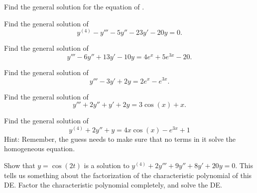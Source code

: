 \begin{exercise}
Find the general solution for the equation of .
\end{exercise}

\begin{exercise}\ansMark%
Find the general solution of
\begin{equation*}
y^{(4)} - y''' - 5y'' - 23y' - 20y = 0.
\end{equation*}
\end{exercise}

\begin{exercise}
Find the general solution of
\begin{equation*}
y''' - 6y'' + 13y' - 10y = 4e^x + 5e^{3x} - 20.
\end{equation*}
\end{exercise}

\begin{exercise}
Find the general solution of
\begin{equation*}
y''' - 3y' + 2y = 2e^{x} - e^{3x}.
\end{equation*}
\end{exercise}

\begin{exercise}
Find the general solution of
\begin{equation*}
y''' + 2y'' + y' + 2y = 3\cos(x) + x.
\end{equation*}
\end{exercise}

\begin{exercise}
Find the general solution of 
\begin{equation*}
y^{(4)}  + 2y'' + y = 4x\cos(x) - e^{3x} + 1
\end{equation*}
Hint: Remember, the guess needs to make sure that no terms in it solve the homogeneous equation.
\end{exercise}

\begin{exercise}
Show that $y=\cos(2t)$ is a solution to $y^{(4)}+2y'''+9y''+8y'+20y=0$. %
This tells us something about the factorization of the characteristic polynomial of this DE. Factor the characteristic polynomial completely, and solve the DE.
\end{exercise}

